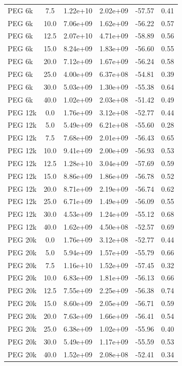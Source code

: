 \begin{tabular}{lccccc}
PEG 6k & 7.5 & 1.22e+10 & 2.02e+09 & -57.57 & 0.41 \\
PEG 6k & 10.0 & 7.06e+09 & 1.62e+09 & -56.22 & 0.57 \\
PEG 6k & 12.5 & 2.07e+10 & 4.71e+09 & -58.89 & 0.56 \\
PEG 6k & 15.0 & 8.24e+09 & 1.83e+09 & -56.60 & 0.55 \\
PEG 6k & 20.0 & 7.12e+09 & 1.67e+09 & -56.24 & 0.58 \\
PEG 6k & 25.0 & 4.00e+09 & 6.37e+08 & -54.81 & 0.39 \\
PEG 6k & 30.0 & 5.03e+09 & 1.30e+09 & -55.38 & 0.64 \\
PEG 6k & 40.0 & 1.02e+09 & 2.03e+08 & -51.42 & 0.49 \\
PEG 12k & 0.0 & 1.76e+09 & 3.12e+08 & -52.77 & 0.44 \\
PEG 12k & 5.0 & 5.49e+09 & 6.21e+08 & -55.60 & 0.28 \\
PEG 12k & 7.5 & 7.68e+09 & 2.01e+09 & -56.43 & 0.65 \\
PEG 12k & 10.0 & 9.41e+09 & 2.00e+09 & -56.93 & 0.53 \\
PEG 12k & 12.5 & 1.28e+10 & 3.04e+09 & -57.69 & 0.59 \\
PEG 12k & 15.0 & 8.86e+09 & 1.86e+09 & -56.78 & 0.52 \\
PEG 12k & 20.0 & 8.71e+09 & 2.19e+09 & -56.74 & 0.62 \\
PEG 12k & 25.0 & 6.71e+09 & 1.49e+09 & -56.09 & 0.55 \\
PEG 12k & 30.0 & 4.53e+09 & 1.24e+09 & -55.12 & 0.68 \\
PEG 12k & 40.0 & 1.62e+09 & 4.50e+08 & -52.57 & 0.69 \\
PEG 20k & 0.0 & 1.76e+09 & 3.12e+08 & -52.77 & 0.44 \\
PEG 20k & 5.0 & 5.94e+09 & 1.57e+09 & -55.79 & 0.66 \\
PEG 20k & 7.5 & 1.16e+10 & 1.52e+09 & -57.45 & 0.32 \\
PEG 20k & 10.0 & 6.83e+09 & 1.81e+09 & -56.13 & 0.66 \\
PEG 20k & 12.5 & 7.55e+09 & 2.25e+09 & -56.38 & 0.74 \\
PEG 20k & 15.0 & 8.60e+09 & 2.05e+09 & -56.71 & 0.59 \\
PEG 20k & 20.0 & 7.63e+09 & 1.66e+09 & -56.41 & 0.54 \\
PEG 20k & 25.0 & 6.38e+09 & 1.02e+09 & -55.96 & 0.40 \\
PEG 20k & 30.0 & 5.49e+09 & 1.17e+09 & -55.59 & 0.53 \\
PEG 20k & 40.0 & 1.52e+09 & 2.08e+08 & -52.41 & 0.34 \\

\end{tabular}
